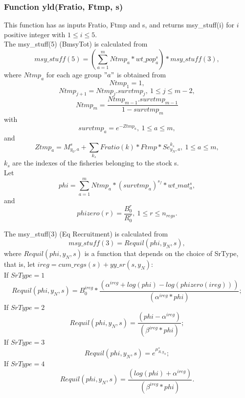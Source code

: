\documentclass{article}
\begin{document}
\subsubsection{Function yld(Fratio, Ftmp, s)}

This function has as inputs Fratio, Ftmp and s, and returns msy\_stuff(i) for $i$ positive integer with $1\leq i \leq 5$. \\

The msy\_stuff(5) (BmsyTot) is calculated from
\begin{equation}
    msy\_stuff(5)=\left(\sum_{a=1}^m Ntmp_a*wt\_pop^s_a\right)*msy\_stuff(3),
\end{equation}
where $Ntmp_a$ for each age group $"a"$ is obtained from 
\begin{equation}
    Ntmp_1=1,
\end{equation}
\begin{equation}
    Ntmp_{j+1}=Ntmp_j.survtmp_j, \ 1\leq j \leq m-2,
\end{equation}
\begin{equation}
    Ntmp_m=\dfrac{Ntmp_{m-1}.survtmp_{m-1}}{1-survtmp_m}
\end{equation}
with
\begin{equation}
    survtmp_a=e^{-Ztmp_a}, \ 1\leq a \leq m,
\end{equation}
and
\begin{equation}
    Ztmp_a=M^s_{y_0,a}+\sum_{k_s}Fratio(k)*Ftmp*Se^{k_s}_{y_N,a}, \ 1\leq a \leq m, 
\end{equation}
$k_s$ are the indexes of the fisheries belonging to the stock s.\\

Let 
\begin{equation}
    phi= \sum_{a=1}^m Ntmp_a*(survtmp_a)^{s_f}*wt\_mat^s_a,
\end{equation}
and 
\begin{equation}
    phizero(r)=\dfrac{B_0^r}{R_0^r}, \ 1\leq r \leq n_{regs}.
\end{equation}


The msy\_stuff(3) (Eq Recruitment) is calculated from
\begin{equation}
    msy\_stuff(3)  = Requil(phi,y_N,s),
\end{equation}
where $Requil(phi,y_N,s)$ is a function that depends on the choice of SrType, that is, let $ireg=cum\_regs(s)+yy\_sr(s,y_N)$:\\
If $SrType=1$
\begin{equation}
    Requil(phi,y_N,s)=B_0^{ireg} * \dfrac{(\alpha^{ireg} + log(phi) - log(phizero(ireg)) )}  {(\alpha^{ireg}*phi)};
\end{equation}
If $SrType=2$
\begin{equation}
Requil(phi,y_N,s)=\dfrac{(phi-\alpha^{ireg})}{(\beta^{ireg}*phi)};
\end{equation}
If $SrType=3$
\begin{equation}
    Requil(phi,y_N,s)=e^{\mu^s_{R,y_N}};
\end{equation}
If $SrType=4$
\begin{equation}
    Requil(phi,y_N,s)=\dfrac{(log(phi)+\alpha^{ireg})}{(\beta^{ireg}*phi)}.
\end{equation}
\end{document}
